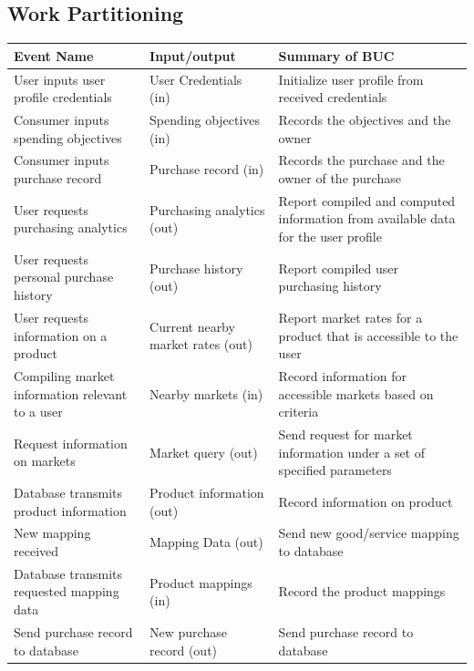 \documentclass[12pt]{article}
\begin{document}
\subsection{Work Partitioning}
    \begin{longtable}{| >{\raggedright\arraybackslash}p{} | >{\raggedright\arraybackslash}p{} | >{\raggedright\arraybackslash}p{} |}
        \hline
        \textbf{Event Name} & \textbf{Input/output} & \textbf{Summary of BUC} \\
        \hline
        User inputs user profile credentials & User Credentials (in) & Initialize user profile from received credentials \\
        \hline
        Consumer inputs spending objectives & Spending objectives (in) & Records the objectives and the owner \\
        \hline
        Consumer inputs purchase record & Purchase record (in) & Records the purchase and the owner of the purchase \\
        \hline
        User requests purchasing analytics & Purchasing analytics (out) & Report compiled and computed information from available data for the user profile \\
        \hline
        User requests personal purchase history & Purchase history (out) & Report compiled user purchasing history\\
        \hline
        User requests information on a product & Current nearby market rates (out) & Report market rates for a product that is accessible to the user \\
        \hline
        Compiling market information relevant to a user & Nearby markets (in) & Record information for accessible markets based on criteria \\
        \hline
        Request information on markets & Market query (out) & Send request for market information under a set of specified parameters \\
        \hline
        Database transmits product information & Product information (out) & Record information on product \\
        \hline
        New mapping received & Mapping Data (out) & Send new good/service mapping to database \\
        \hline
        Database transmits requested mapping data & Product mappings (in) & Record the product mappings \\
        \hline
        Send purchase record to database & New purchase record (out) &  Send purchase record to database \\

\end{longtable}
\end{document}
